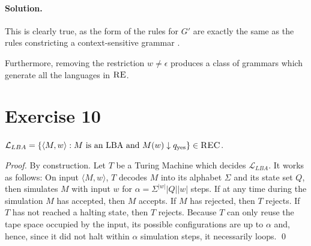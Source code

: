\documentclass[11pt]{llncs}
\begin{document}
\paragraph{Solution.}
This is clearly true, as the form of the rules for $G'$ are exactly the same as
the rules constricting a context-sensitive grammar \cite{chomsky}.

Furthermore, removing the restriction $w \neq \epsilon$ produces a class
of grammars which generate all the languages in $\textsc{RE}$.

\section*{Exercise 10}
\begin{lemma}
  $\mathcal{L}_{LBA} = \{\langle M, w \rangle: M \text{ is an LBA and } M(w)\downarrow q_\text{yes}\} \in \textsc{REC}$.
\end{lemma}
\begin{proof}
By construction. Let $T$ be a Turing Machine which decides $\mathcal{L}_{LBA}$.
It works as follows: On input $\langle M, w \rangle$, $T$ decodes $M$ into its
alphabet $\Sigma$ and its state set $Q$, then simulates $M$ with input $w$ for
$\alpha = \Sigma^{|w|} |Q| |w|$ steps. If at any time during the simulation $M$
has accepted, then $M$ accepts. If $M$ has rejected, then $T$ rejects. If $T$
has not reached a halting state, then $T$ rejects. Because $T$ can only reuse
the tape space occupied by the input, its possible configurations are up to
$\alpha$ and, hence, since it did not halt within $\alpha$ simulation steps, it
necessarily loops.
\qed
\end{proof}


\end{document}
